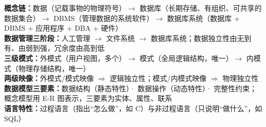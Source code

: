 \documentclass[a4paper,11pt]{article}
\begin{document}

\begin{knowmap}
\textbf{概念链：}数据（记载事物的物理符号）$\rightarrow$ 数据库（长期存储、有组织、可共享的数据集合）$\rightarrow$ DBMS（管理数据的系统软件）$\rightarrow$ 数据库系统（数据库 + DBMS + 应用程序 + DBA + 硬件）\\[2pt]
\textbf{数据管理三阶段：}人工管理 $\rightarrow$ 文件系统 $\rightarrow$ 数据库系统；数据独立性由无到有、由弱到强，冗余度由高到低\\[2pt]
\textbf{三级模式：}外模式（用户视图，多个）$\rightarrow$ 模式（全局逻辑结构，唯一）$\rightarrow$ 内模式（物理存储结构，唯一）\\[2pt]
\textbf{两级映像：}外模式/模式映像 $\Rightarrow$ 逻辑独立性；模式/内模式映像 $\Rightarrow$ 物理独立性\\[2pt]
\textbf{数据模型三要素：}数据结构（静态特性）· 数据操作（动态特性）· 完整性约束；概念模型用 E-R 图表示，三要素为实体、属性、联系\\[2pt]
\textbf{语言特性：}过程语言（指出“怎么做”，如 C）与非过程语言（只说明“做什么”，如 SQL）
\end{knowmap}
\end{document}
